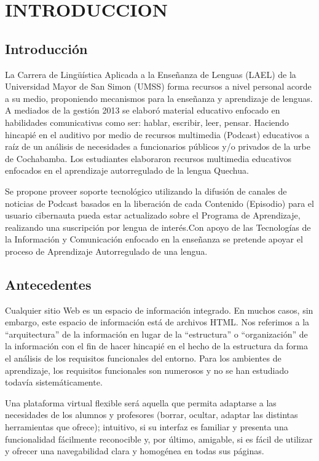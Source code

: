 \chapter{INTRODUCCION}

\section{Introducción}

La Carrera de Lingüística Aplicada a la Enseñanza de Lenguas (LAEL) de la Universidad Mayor de
San Simon (UMSS) forma recursos a nivel personal acorde a su medio, proponiendo mecanismos para
la enseñanza y aprendizaje de lenguas. A mediados de la gestión 2013 se elaboró material 
educativo enfocado en habilidades comunicativas como ser: hablar, escribir, leer, pensar.
Haciendo hincapié en el auditivo por medio de recursos multimedia (Podcast) educativos 
a raíz de un análisis de necesidades a funcionarios públicos y/o privados de la urbe de
Cochabamba. Los estudiantes elaboraron recursos multimedia educativos enfocados en el 
aprendizaje autorregulado de la lengua Quechua.

Se propone proveer soporte tecnológico utilizando la difusión de canales de noticias de
Podcast basados en la liberación de cada Contenido (Episodio) para el usuario 
cibernauta pueda estar actualizado sobre el Programa de Aprendizaje, realizando una 
suscripción por lengua de interés.Con apoyo de las Tecnologías de la Información y
Comunicación enfocado en la enseñanza se pretende apoyar el proceso de Aprendizaje
Autorregulado de una lengua.

\section{Antecedentes}

Cualquier sitio Web es un espacio de información integrado. En muchos casos, sin embargo, este
espacio de información está de archivos HTML. Nos referimos a la ``arquitectura'' de la información
en lugar de la ``estructura'' o ``organización'' de la información con el fin de hacer hincapié en el
hecho de la estructura da forma el análisis de los requisitos funcionales del entorno. Para los
ambientes de aprendizaje, los requisitos funcionales son numerosos y no se han estudiado todavía
sistemáticamente.

Una plataforma virtual flexible será aquella que permita adaptarse a las necesidades de los alumnos
y profesores (borrar, ocultar, adaptar las distintas herramientas que ofrece); intuitivo, si su 
interfaz es familiar y presenta una funcionalidad fácilmente reconocible y, por último, amigable,
si es fácil de utilizar y ofrecer una navegabilidad clara y homogénea en todas sus páginas.

